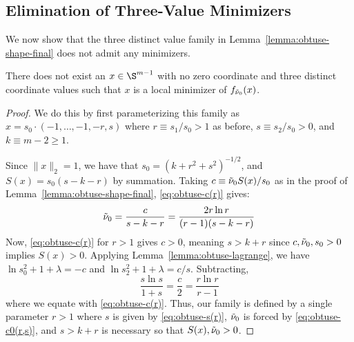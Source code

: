 \documentclass[11pt]{article}
\begin{document}
\subsection{Elimination of Three-Value Minimizers}
We now show that the three distinct value family in Lemma~\ref{lemma:obtuse-shape-final} does not admit any minimizers. 
\begin{lemma}\label{lemma:obtuse-no-three}
    There does not exist an $x\in \S^{m-1}$ with no zero coordinate and three distinct coordinate values such that $x$ is a local minimizer of $f_{{\Tilde \nu_0}}(x)$.
\end{lemma}
\begin{proof}
    
We do this by first parameterizing this family as $x=s_0\cdot (-1,\dots,-1,-r,s)$ where $r\equiv s_1/s_0>1$ as before, $s\equiv s_2/s_0>0$, and $k\equiv m-2\geq 1$. 

Since $\|x\|_2=1$, we have that $s_0=(k+r^2+s^2)^{-1/2}$, and $S(x)=s_0(s-k-r)$ by summation. Taking $c\equiv {\Tilde \nu_0} S(x)/s_0$ as in the proof of Lemma~\ref{lemma:obtuse-shape-final}, \eqref{eq:obtuse-c(r)} gives:
\begin{equation}\label{eq:obtuse-c0(r,s)}
    {\Tilde \nu_0}=\frac{c}{s-k-r}=\frac{2r\ln r }{(r-1)(s-k-r)}
\end{equation}
Now, \eqref{eq:obtuse-c(r)} for $r>1$ gives $c>0$, meaning $s>k+r$ since $c,{\Tilde \nu_0},s_0>0$ implies $S(x)>0$. Applying Lemma~\ref{lemma:obtuse-lagrange}, we have $\ln s_0^2 + 1+\lambda=-c$ and $\ln s_2^2+1+\lambda=c/s$. Subtracting, 
\begin{equation}\label{eq:obtuse-s(r)}
    \frac{s\ln s}{1+s}=\frac c 2 =\frac{r\ln r }{r-1}
\end{equation}
where we equate with \eqref{eq:obtuse-c(r)}. Thus, our family is defined by a single parameter $r>1$ where $s$ is given by \eqref{eq:obtuse-s(r)}, ${\Tilde \nu_0}$ is forced by \eqref{eq:obtuse-c0(r,s)}, and $s>k+r$ is necessary so that $S(x),{\Tilde \nu_0}>0$. 


\end{proof}
\end{document}
